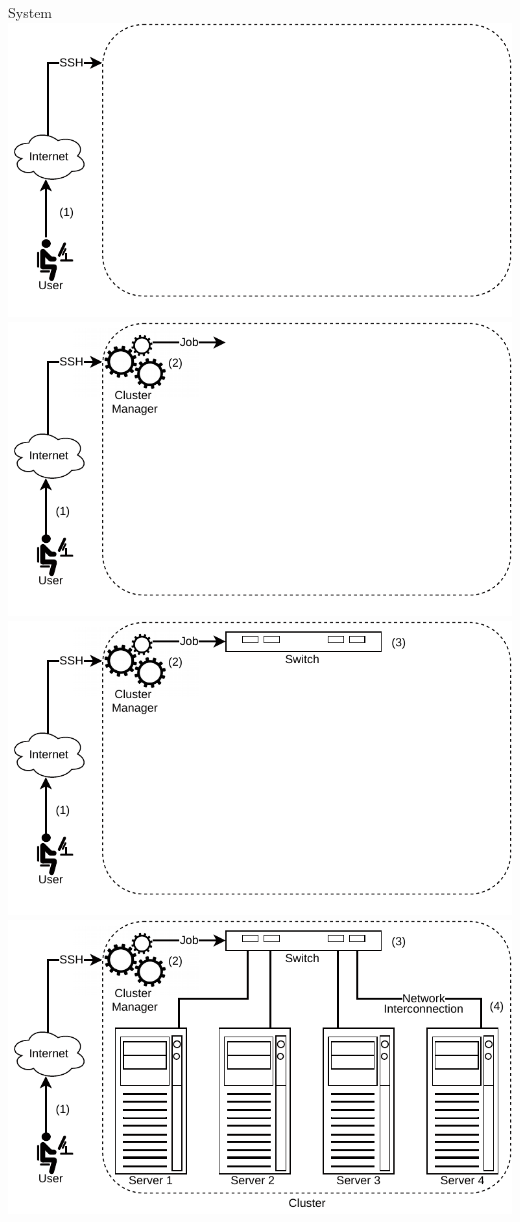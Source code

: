 \documentclass[presentation]{beamer}
\begin{document}
\begin{frame}[allowframebreaks]{System}
    \includegraphics[width=\textwidth]{SLIDES/img/System1.pdf}
    \framebreak
    \includegraphics[width=\textwidth]{SLIDES/img/System2.pdf}
    \framebreak
    \includegraphics[width=\textwidth]{SLIDES/img/System3.pdf}
    \framebreak
    \includegraphics[width=\textwidth]{SLIDES/img/System4.pdf}

\end{frame}
\end{document}
